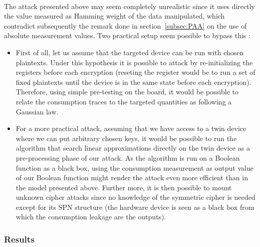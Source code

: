 \documentclass[11pt,a4paper]{article}
\begin{document}
{{{{{{{{{\paragraph{}               
The attack presented above may seem completely unrealistic since it uses directly the value measured as Hamming weight of the data manipulated, which contradict 
subsequently the remark done in section~\ref{subsec:PAA} on the use of absolute measurement values. Two practical setup seem possible to bypass this :
\begin{itemize}
  \item First of all, let us assume that the targeted device can be run with chosen plaintexts. Under this hypothesis it is possible
        to attack by re-initializing the registers before each encryption (reseting the register would be to run a set of fixed plaintexts until the device is in 
	the same state before each encryption). Therefore, using simple pre-testing on the board, it would be possible to relate the consumption traces to 
	the targeted quantities as following a Gaussian law.
  \item For a more practical attack, assuming that we have access to a twin device where we can put arbitrary chosen keys, it
        would be possible to run the algorithm that search linear approximations directly on the twin device as a pre-processing phase of our attack. 
	As the algorithm is run on a Boolean function 
	as a black box, using the consumption measurement as output value of our Boolean function might render the attack even more efficient than in the model 
	presented above. Further more, it is then possible to mount unknown cipher attacks since no knowledge of the symmetric cipher is needed except for its SPN structure (the hardware 
	device is seen as a black box from which the consumption leakage are the outputs).
        
\end{itemize}

\subsubsection{Results}
\label{subsec:results}
}}}}}}}}}
\end{document}
